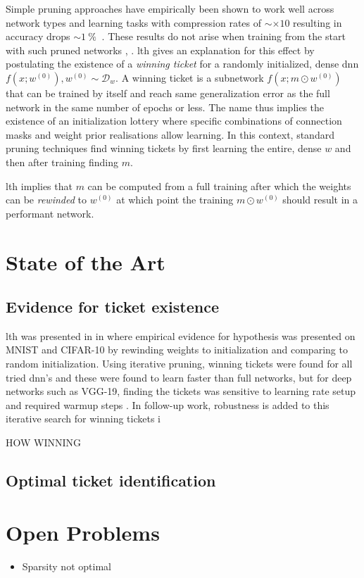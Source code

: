 \documentclass[12pt,fleqn,twocolumn]{article}
\newcommand{\pro}{\ensuremath{\:\%{}\:}}
\begin{document}
Simple pruning approaches have empirically been shown to work well across network types and learning tasks with compression rates of $\sim \times 10$ resulting in accuracy drops $\sim 1\pro$ \cite[Fig. 7] {bla2020state}.
These results do not arise when training from the start with such pruned networks \cite[Chap. 4]{li2016filt}, \cite[Chap. 3.3]{han2015learning}.
\acrshort{lth} gives an explanation for this effect by postulating the existence of a \emph{winning ticket} for a randomly initialized, dense \acrshort{dnn} $f(x;w^{(0)}), w^{(0)}\sim \mathcal D_w$.
A winning ticket is a subnetwork $f(x;m\odot w^{(0)})$ that can be trained by itself and reach same generalization error as the full network in the same number of epochs or less.
The name thus implies the existence of an initialization lottery where specific combinations of connection masks and weight prior realisations allow learning.
In this context, standard pruning techniques find winning tickets by first learning the entire, dense $w$ and then after training finding $m$.

\acrshort{lth} implies that $m$ can be computed from a full training after which the weights can be \emph{rewinded} to $w^{(0)}$ at which point the training $m \odot w^{(0)}$ should result in a performant network.

\section*{State of the Art}%
\subsection*{Evidence for ticket existence}
\acrshort{lth} was presented in \textcite{frankle2018the} in \citeyear{frankle2018the} where empirical evidence for hypothesis was presented on MNIST and CIFAR-10 by rewinding weights to initialization and comparing to random initialization.
Using iterative pruning, winning tickets were found for all tried \acrshort{dnn}'s and these were found to learn faster than full networks, but for deep networks such as VGG-19, finding the tickets was sensitive to learning rate setup and required warmup steps \cite[Chap. 4]{frankle2018the}.
In follow-up work, robustness is added to this iterative search for winning tickets i \cite{Frankle2020LinearMC}

HOW WINNING \cite{Renda2020ComparingRA}




\subsection*{Optimal ticket identification}

\section*{Open Problems}%
\label{sec:Open Problems}
\begin{itemize}
    \item Sparsity not optimal
\end{itemize}

\clearpage
\renewcommand*{\bibfont}{\normalfont\footnotesize}
\printbibliography[heading=bibintoc]

\printglossary[type=\acronymtype]
\end{document}

